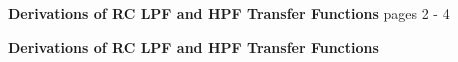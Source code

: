 \documentclass{letter}
\begin{document}
\fancyhead[R]{\fontsize{15pt}{15pt}\selectfont \thepage}
\fancyfoot{}

\begin{flushleft}
    \fontsize{15pt}{15pt}\selectfont

    \textbf{Derivations of RC LPF and HPF Transfer Functions} \hfill pages 2 - 4

    \end{flushleft}

\pagebreak

\fancyhead[C]{}



\begin{center}
\vspace{4.5in} 
\fontsize{30pt}{30pt}\selectfont
\textbf{Derivations of RC LPF and HPF Transfer Functions}
\end{center}
\vfill

\pagebreak

\end{document}
